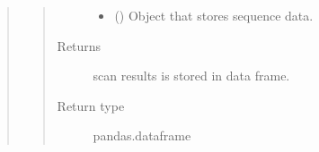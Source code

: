 \documentclass[letterpaper,10pt,english]{sphinxmanual}
\begin{document}
\begin{quote}
\begin{fulllineitems}
\begin{quote}
\begin{description}
\begin{itemize}
\item {} 
 () \textendash{} Object that stores sequence data.

\end{itemize}

\item[{Returns}] \leavevmode
scan results is stored in data frame.

\item[{Return type}] \leavevmode
pandas.dataframe

\end{description}\end{quote}

\end{fulllineitems}

\end{quote}
\end{document}
